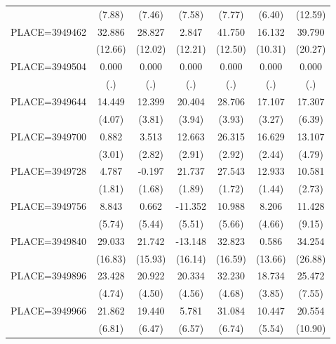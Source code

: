 {\begin{tabular}{l*{6}{c}}
                    &      (7.88)&      (7.46)&      (7.58)&      (7.77)&      (6.40)&     (12.59)\\
PLACE=3949462       &      32.886&      28.827&       2.847&      41.750&      16.132&      39.790\\
                    &     (12.66)&     (12.02)&     (12.21)&     (12.50)&     (10.31)&     (20.27)\\
PLACE=3949504       &       0.000&       0.000&       0.000&       0.000&       0.000&       0.000\\
                    &         (.)&         (.)&         (.)&         (.)&         (.)&         (.)\\
PLACE=3949644       &      14.449&      12.399&      20.404&      28.706&      17.107&      17.307\\
                    &      (4.07)&      (3.81)&      (3.94)&      (3.93)&      (3.27)&      (6.39)\\
PLACE=3949700       &       0.882&       3.513&      12.663&      26.315&      16.629&      13.107\\
                    &      (3.01)&      (2.82)&      (2.91)&      (2.92)&      (2.44)&      (4.79)\\
PLACE=3949728       &       4.787&      -0.197&      21.737&      27.543&      12.933&      10.581\\
                    &      (1.81)&      (1.68)&      (1.89)&      (1.72)&      (1.44)&      (2.73)\\
PLACE=3949756       &       8.843&       0.662&     -11.352&      10.988&       8.206&      11.428\\
                    &      (5.74)&      (5.44)&      (5.51)&      (5.66)&      (4.66)&      (9.15)\\
PLACE=3949840       &      29.033&      21.742&     -13.148&      32.823&       0.586&      34.254\\
                    &     (16.83)&     (15.93)&     (16.14)&     (16.59)&     (13.66)&     (26.88)\\
PLACE=3949896       &      23.428&      20.922&      20.334&      32.230&      18.734&      25.472\\
                    &      (4.74)&      (4.50)&      (4.56)&      (4.68)&      (3.85)&      (7.55)\\
PLACE=3949966       &      21.862&      19.440&       5.781&      31.084&      10.447&      20.554\\
                    &      (6.81)&      (6.47)&      (6.57)&      (6.74)&      (5.54)&     (10.90)\\

\end{tabular}}
